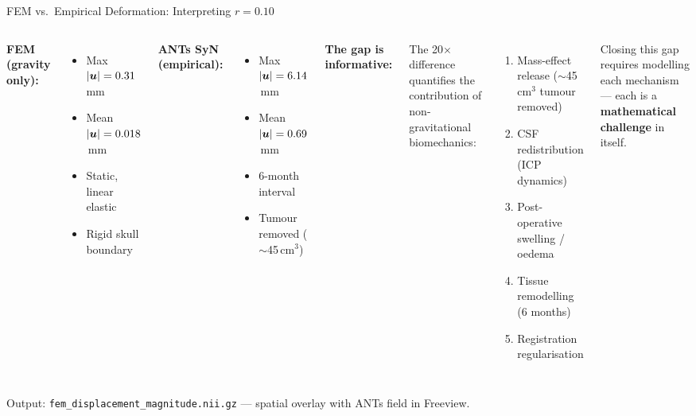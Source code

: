 \begin{frame}{FEM vs.\ Empirical Deformation: Interpreting $r = 0.10$}

  \small

  \begin{columns}[T]
    \textbf{FEM (gravity only):}
    \begin{itemize}\setlength\itemsep{1pt}
      \item Max $|\bm{u}| = 0.31$\,mm
      \item Mean $|\bm{u}| = 0.018$\,mm
      \item Static, linear elastic
      \item Rigid skull boundary
    \end{itemize}

    \medskip

    \textbf{ANTs SyN (empirical):}
    \begin{itemize}\setlength\itemsep{1pt}
      \item Max $|\bm{u}| = 6.14$\,mm
      \item Mean $|\bm{u}| = 0.69$\,mm
      \item 6-month interval
      \item Tumour removed ($\sim$45\,cm$^3$)
    \end{itemize}

    \textbf{The gap is informative:}

    \medskip

    The 20$\times$ difference quantifies the contribution
    of \alert{non-gravitational biomechanics}:

    \begin{enumerate}\setlength\itemsep{2pt}
      \item Mass-effect release ($\sim$45\,cm$^3$ tumour removed)
      \item CSF redistribution (ICP dynamics)
      \item Post-operative swelling / oedema
      \item Tissue remodelling (6 months)
      \item Registration regularisation
    \end{enumerate}

    \medskip

    Closing this gap requires modelling each mechanism ---
    each is a \textbf{mathematical challenge} in itself.
  \end{columns}

  \bigskip

  \centering
  Output: \texttt{fem\_displacement\_magnitude.nii.gz} ---
  spatial overlay with ANTs field in Freeview.

\end{frame}

